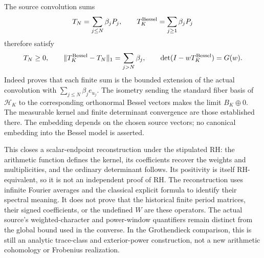 The source convolution sums
\[
 T_N=\sum_{j\le N}\beta_jP_j,\qquad
 T_K^{\rm Bessel}=\sum_{j\ge1}\beta_jP_j
\]
therefore satisfy
\[
 T_N\ge0,\qquad
 \|T_K^{\rm Bessel}-T_N\|_1=\sum_{j>N}\beta_j,\qquad
 \det(I-wT_K^{\rm Bessel})=G(w).
\]
Indeed  proves that each finite sum is the bounded
extension of the actual convolution with
\(\sum_{j\le N}\beta_je_{u_j}\). The isometry sending the standard
fiber basis of \(\mathcal H_K\) to the corresponding orthonormal
Bessel vectors makes the limit \(B_K\oplus0\).
The measurable kernel and finite determinant convergence are
those established there. The embedding depends on the chosen
source vectors; no canonical embedding into the Bessel model
is asserted.

This closes a scalar-endpoint reconstruction under the stipulated RH:
the arithmetic function defines the kernel, its coefficients recover
the weights and multiplicities, and the ordinary determinant follows.
Its positivity is itself RH-equivalent, so it is not an independent
proof of RH. The reconstruction uses infinite Fourier averages and
the classical explicit formula to identify their spectral meaning.
It does not prove that the historical finite period matrices,
their signed coefficients, or the undefined \(W\) are these operators.
The actual source's weighted-character and power-window quantifiers
remain distinct from the global bound used in the converse.
In the Grothendieck comparison, this is still an analytic
trace-class and exterior-power construction, not a new arithmetic
cohomology or Frobenius realization.
